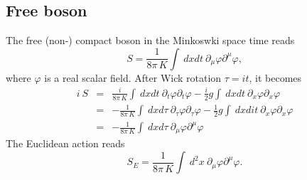 \documentclass[submission, PhysLectNotes]{SciPost}
\begin{document}
\subsection{Free boson}
The free (non-) compact boson in the Minkoswki space time reads~\cite{Blumenhagen:2009zz}
\begin{equation}
    S = \frac{1}{8\pi\,K}\int \ dxdt \ \partial_\mu \varphi \partial^\mu \varphi,
\end{equation}
where $\varphi$ is a real scalar field. After Wick rotation $\tau = it$, it becomes
\begin{eqnarray}
    i\ S &=& \frac{i}{8\pi\,K}\int \ dxdt \ \partial_t \varphi \partial_t \varphi - \frac{i}{2}g\int \ dxdt \ \partial_x \varphi \partial_x \varphi \nonumber \\
    &=& -\frac{1}{8\pi\,K}\int \ dxd\tau \ \partial_\tau \varphi \partial_\tau \varphi - \frac{1}{2}g\int \ dxdit \ \partial_x \varphi \partial_x \varphi \nonumber \\
    &=& -\frac{1}{8\pi\,K}\int \ dxd\tau \ \partial_\mu \varphi \partial^\mu \varphi
\end{eqnarray}
The Euclidean action reads
\begin{equation}
    S_E = \frac{1}{8\pi\,K}\int \ d^2x \ \partial_\mu \varphi \partial^\mu \varphi.
\end{equation}
\end{document}
